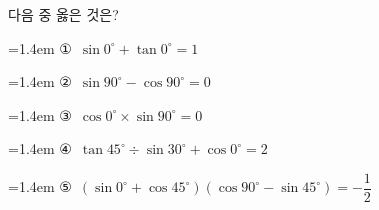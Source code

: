 다음 중 옳은 것은?
\par\medskip\par\noindent\hangindent=1.4em {\small ①}\ $\sin 0^\circ+\tan 0^\circ=1$\par\noindent\hangindent=1.4em {\small ②}\ $\sin 90^\circ-\cos 90^\circ=0$\par\noindent\hangindent=1.4em {\small ③}\ $\cos 0^\circ\times\sin 90^\circ=0$\par\noindent\hangindent=1.4em {\small ④}\ $\tan 45^\circ\div\sin 30^\circ+\cos 0^\circ=2$\par\noindent\hangindent=1.4em {\small ⑤}\ $(\sin 0^\circ+\cos 45^\circ)(\cos 90^\circ-\sin 45^\circ)=-\dfrac{1}{2}$\par\medskip
